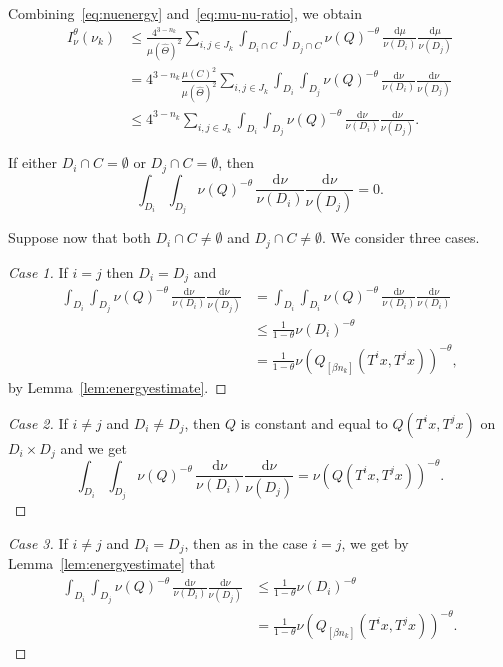 \documentclass[AHL,Unicode,longabstracts]{cedram}
\newcommand*{\dd}{\mathrm{d}}
\newenvironment{step}{\begin{proof}}{\let\qed\relax \end{proof}}
\begin{document}
Combining~\eqref{eq:nuenergy} and~\eqref{eq:mu-nu-ratio}, we obtain
\begin{align*}
I_\nu^\theta (\nu_k) &\leq \frac{4^{3-n_k}}{\mu (\hat{\Theta})^2}
\sum_{i,j \in J_k} \int_{D_i \cap C} \int_{D_j \cap C} \nu (Q)^{-\theta} \, \frac{\dd \mu}{\nu (D_i)} \frac{\dd
\mu}{\nu (D_j)} \\ &= 4^{3-n_k} \frac{\mu(C)^2}{\mu (\hat{\Theta})^2} \sum_{i,j \in J_k} \int_{D_i} \int_{D_j} \nu (Q)^{-\theta} \, \frac{\dd \nu}{\nu (D_i)} \frac{\dd
\nu}{\nu (D_j)} \\ &\leq 4^{3-n_k} \sum_{i,j \in J_k} \int_{D_i}
\int_{D_j} \nu (Q)^{-\theta} \, \frac{\dd \nu}{\nu (D_i)}
\frac{\dd \nu}{\nu (D_j)}.
\end{align*}

If either $D_i \cap C = \emptyset$ or $D_j \cap C = \emptyset$, then
\[
\int_{D_i} \int_{D_j} \nu (Q)^{-\theta} \, \frac{\dd \nu}{\nu (D_i)} \frac{\dd \nu}{\nu (D_j)} = 0.
\]

Suppose now that both $D_i \cap C \neq \emptyset$ and $D_j \cap C \neq
\emptyset$. We consider three cases.

\begin{step}[Case 1]
If $i = j$ then $D_i = D_j$ and
\begin{align*}
\int_{D_i} \int_{D_j} \nu (Q)^{-\theta} \, \frac{\dd \nu}{\nu (D_i)} \frac{\dd \nu}{\nu (D_j)} &= \int_{D_i} \int_{D_i}
\nu (Q)^{-\theta} \, \frac{\dd \nu}{\nu (D_i)}
\frac{\dd \nu}{\nu (D_i)} \\ &\leq \frac{1}{1 - \theta} \nu (D_i)^{-\theta} \\ &= \frac{1}{1-\theta} \nu (Q_{[\beta n_k]} (T^i x, T^j x))^{-\theta},
\end{align*}
by Lemma~\ref{lem:energyestimate}.
\end{step}

\begin{step}[Case 2]
If $i \neq j$ and $D_i \neq D_j$, then $Q$ is constant and equal to $Q(T^i x, T^j x)$ on $D_i \times D_j$ and we get
\[
\int_{D_i} \int_{D_j} \nu (Q)^{-\theta} \, \frac{\dd \nu}{\nu (D_i)} \frac{\dd \nu}{\nu (D_j)} = \nu (Q (T^i x, T^j x))^{-\theta}.
\]
\end{step}

\begin{step}[Case 3]
If $i \neq j$ and $D_i = D_j$, then as in the case $i = j$, we get by Lemma~\ref{lem:energyestimate} that
\begin{align*}
\int_{D_i} \int_{D_j} \nu (Q)^{-\theta} \, \frac{\dd \nu}{\nu (D_i)} \frac{\dd \nu}{\nu (D_j)} & \leq \frac{1}{1-\theta}
\nu (D_i)^{-\theta} \\ &= \frac{1}{1-\theta} \nu (Q_{[\beta n_k]} (T^i x, T^j x))^{-\theta}.
\end{align*}
\end{step}
\end{document}

